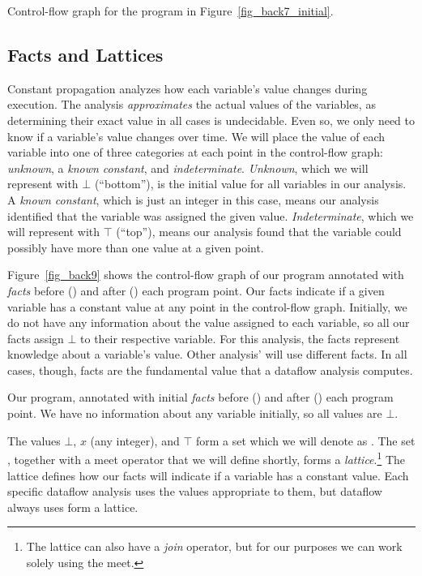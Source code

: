 \documentclass[12pt]{report}
\begin{document}
\begin{myfig}[tbh]
  
  \caption{Control-flow graph for the program in
    Figure~\ref{fig_back7_initial}.}
  \label{fig_back8}
\end{myfig}

\subsection{Facts and Lattices} 
\label{back_subsec_facts}

Constant propagation analyzes how each variable's value changes during
execution. The analysis \emph{approximates} the actual values of the
variables, as determining their exact value in all cases is
undecidable. Even so, we only need to know if a variable's value
changes over time. We will place the value of each variable into one
of three categories at each point in the control-flow graph:
\emph{unknown}, a \emph{known constant}, and
\emph{indeterminate}. \emph{Unknown}, which we will represent with
$\bot$ (``bottom''), is the initial value for all variables in our
analysis. A \emph{known constant}, which is just an integer in this
case, means our analysis identified that the variable was assigned the
given value. \emph{Indeterminate}, which we will represent with $\top$
(``top''), means our analysis found that the variable could possibly
have more than one value at a given point.

Figure~\ref{fig_back9} shows the control-flow graph of our program
annotated with \emph{facts} before (\inE) and after (\out) each
program point. Our facts indicate if a given variable has a constant
value at any point in the control-flow graph. Initially, we do not
have any information about the value assigned to each variable, so all
our facts assign $\bot$ to their respective variable. For this
analysis, the facts represent knowledge about a variable's
value. Other analysis' will use different facts. In all cases, though,
facts are the fundamental value that a dataflow analysis computes.

\begin{myfig}
  
  \label{fig_back9}
  \caption{Our program, annotated with initial \emph{facts} before
    (\inE) and after (\out) each program point. We have no information
    about any variable initially, so all values are $\bot$.}
\end{myfig}

The values $\bot$, $x$ (any integer), and $\top$ form a set which we will
denote as \setLC. The set \setLC, together with a meet
operator that we will define shortly, forms a
\emph{lattice}.\footnote{The lattice can also have a \emph{join}
  operator, but for our purposes we can work solely using the meet.}
The lattice defines how our facts will indicate if a variable has a
constant value. Each specific dataflow analysis uses the values
appropriate to them, but dataflow always uses form a lattice.
\end{document}
